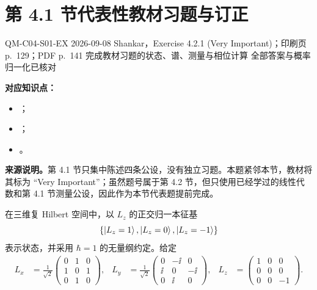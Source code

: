 
\section{第 4.1 节代表性教材习题与订正}
\label{exercise-set:QM-C04-S01}

\exercisemeta
  {QM-C04-S01-EX}
  {2026-09-08}
  {Shankar，Exercise 4.2.1 (Very Important)；印刷页 p.~129；PDF p.~141}
  {完成教材习题的状态、谱、测量与相位计算}
  {全部答案与概率归一化已核对}


\textbf{对应知识点：}
\begin{itemize}[leftmargin=*]
  \item {}；
  \item {}；
  \item {}。
\end{itemize}

\textbf{来源说明。}第 4.1 节只集中陈述四条公设，没有独立习题。本题紧邻本节，教材将其标为 “Very Important”；虽然题号属于第 4.2 节，但只使用已经学过的线性代数和第 4.1 节测量公设，因此作为本节代表题提前完成。

在三维复 Hilbert 空间中，以 $L_z$ 的正交归一本征基
\[
  \{\left|L_z=1\right\rangle,\left|L_z=0\right\rangle,\left|L_z=-1\right\rangle\}
\]
表示状态，并采用 $\hbar=1$ 的无量纲约定。给定
\begin{align}
  L_x&=\frac1{\sqrt2}
  \begin{pmatrix}
    0&1&0\\
    1&0&1\\
    0&1&0
  \end{pmatrix},
  &
  L_y&=\frac1{\sqrt2}
  \begin{pmatrix}
    0&-\ii&0\\
    \ii&0&-\ii\\
    0&\ii&0
  \end{pmatrix},
  &
  L_z&=
  \begin{pmatrix}
    1&0&0\\
    0&0&0\\
    0&0&-1
  \end{pmatrix}.
  \label{eq:QM-C04-S01-E01-angular-momentum-matrices}
\end{align}

